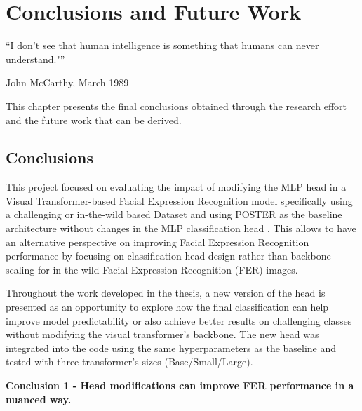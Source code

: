 \chapter{Conclusions and Future Work}
\epigraph{``I don't see that human intelligence is something that humans can never understand."''}{\vspace{10pt}John McCarthy, March 1989}
\label{chapter:conclusions-fw}

\newpage

This chapter presents the final conclusions obtained through the research effort and the future work that can be derived. 



\section{Conclusions}

This project focused on evaluating the impact of modifying the MLP head in a Visual Transformer-based Facial Expression Recognition model specifically using a challenging or \gls{in-the-wild} based Dataset and using \gls{POSTER} as the baseline architecture without changes in the MLP classification head \cite{zheng_poster_2022}. This allows to have an alternative perspective on improving Facial Expression Recognition performance by focusing on classification head design rather than backbone scaling for \gls{in-the-wild} Facial Expression Recognition (\gls{FER}) images. 

Throughout the work developed in the thesis, a new version of the head is presented as an opportunity to explore how the final classification can help improve model predictability or also achieve better results on challenging classes without modifying the visual transformer's backbone. The new head was integrated into the code  using the same hyperparameters as the baseline and tested with three transformer's sizes (Base/Small/Large).

%
%	
%	
%	
%	
%	

\textbf{Conclusion 1 - Head modifications can improve FER performance in a nuanced way.}


